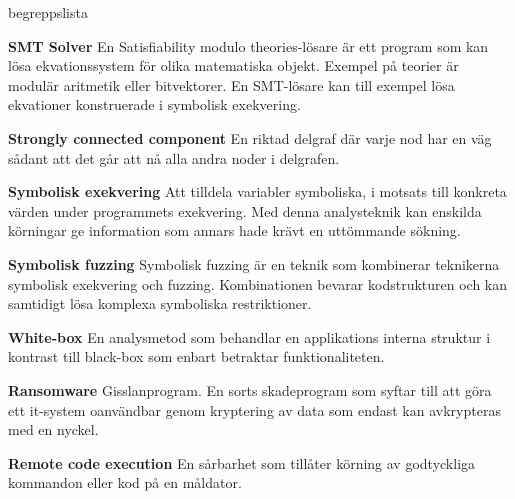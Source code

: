 \begin{labeling}{begreppslista}
    \item [\textbf{SMT Solver}] En Satisfiability modulo theories-lösare är ett
    program som kan lösa ekvationssystem för olika matematiska objekt. Exempel
    på teorier är modulär aritmetik eller bitvektorer. En SMT-lösare kan till
    exempel lösa ekvationer konstruerade i symbolisk exekvering.

    \item [\textbf{Strongly connected component}] En riktad delgraf där  
    varje nod har en väg sådant att det går att nå alla andra noder i delgrafen. 

    \item [\textbf{Symbolisk exekvering}] Att tilldela variabler symboliska, i
    motsats till konkreta värden under programmets exekvering. Med denna
    analysteknik kan enskilda körningar ge information som annars hade krävt
    en uttömmande sökning.

    \item [\textbf{Symbolisk fuzzing}] Symbolisk fuzzing är en teknik som
    kombinerar teknikerna symbolisk exekvering och fuzzing. Kombinationen
    bevarar kodstrukturen och kan samtidigt lösa komplexa symboliska
    restriktioner.

    \item [\textbf{White-box}] En analysmetod som behandlar en applikations
    interna struktur i kontrast till black-box som enbart betraktar
    funktionaliteten.

    \item [\textbf{Ransomware}] Gisslanprogram. En sorts skadeprogram som syftar
    till att göra ett it-system oanvändbar genom kryptering av data som
    endast kan avkrypteras med en nyckel.

    \item [\textbf{Remote code execution}] En sårbarhet som tillåter körning av
    godtyckliga kommandon eller kod på en måldator.
\end{labeling}
